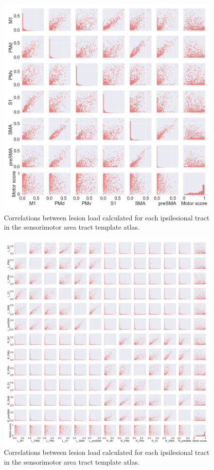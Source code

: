 \documentclass[10pt]{article}
\begin{document}
\begin{figure}[ht]
\centering
\includegraphics[width=0.8\linewidth]{figures/SMATT_scatterplts.png}
\caption{Correlations between lesion load calculated for each ipsilesional tract in the sensorimotor area tract template atlas.}
\label{smatt_pairwise_correlations}
\end{figure}


\begin{figure}[ht]
\centering
\includegraphics[width=0.8\linewidth]{figures/SMATT_bi_scatterplts.png}
\caption{Correlations between lesion load calculated for each ipsilesional tract in the sensorimotor area tract template atlas.}
\label{smatt_pairwise_correlations}
\end{figure}
\end{document}
